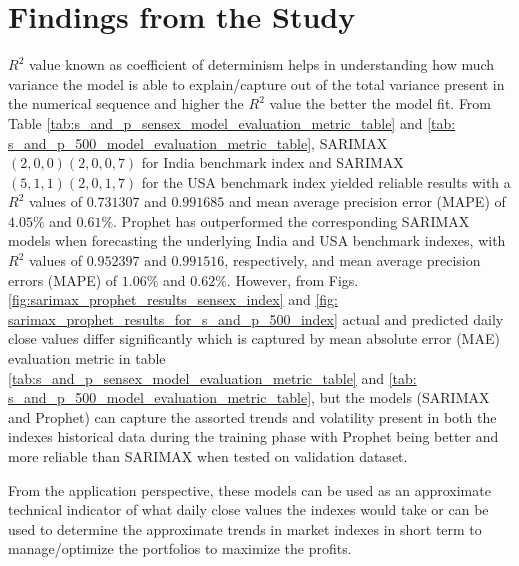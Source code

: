 \documentclass[conference]{IEEEtran}
\begin{document}
\section{Findings from the Study} \label{findings_from_study}
$R^{2}$ value known as coefficient of determinism helps in understanding how much variance the model is able to explain/capture out of the total variance present in the numerical sequence and higher the $R^{2}$ value the better the model fit. From Table \ref{tab:s_and_p_sensex_model_evaluation_metric_table} and \ref{tab: s_and_p_500_model_evaluation_metric_table}, SARIMAX $(2, 0, 0)(2, 0, 0, 7)$ for India benchmark index and SARIMAX $(5, 1, 1)(2, 0, 1, 7)$ for the USA benchmark index yielded reliable results with a $R^{2}$ values of $0.731307$ and $0.991685$ and mean average precision error (MAPE) of $4.05\%$ and $0.61\%$. Prophet has outperformed the corresponding SARIMAX models when forecasting the underlying India and USA benchmark indexes, with $R^{2}$ values of $0.952397$ and $0.991516$, respectively, and mean average precision errors (MAPE) of $1.06\%$ and $0.62\%$. However, from Figs. \ref{fig:sarimax_prophet_results_sensex_index} and \ref{fig: sarimax_prophet_results_for_s_and_p_500_index} actual and predicted daily close values differ significantly which is captured by mean absolute error (MAE) evaluation metric in table \ref{tab:s_and_p_sensex_model_evaluation_metric_table} and \ref{tab: s_and_p_500_model_evaluation_metric_table}, but the models (SARIMAX and Prophet) can capture the assorted trends and volatility present in both the indexes historical data during the training phase with Prophet being better and more reliable than SARIMAX when tested on validation dataset.

From the application perspective, these models can be used as an approximate technical indicator of what daily close values the indexes would take or can be used to determine the approximate trends in market indexes in short term to manage/optimize the portfolios to maximize the profits.
\end{document}
